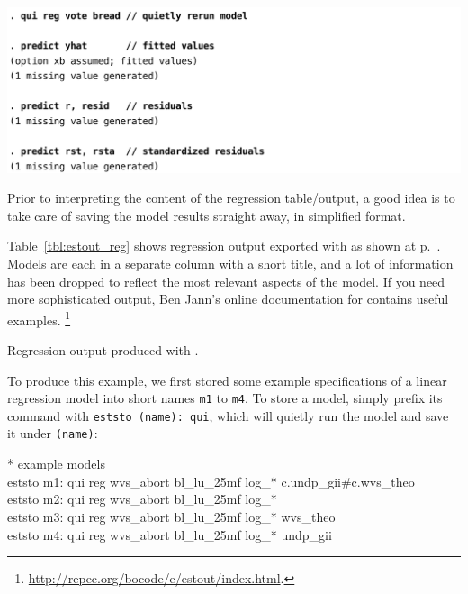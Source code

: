 \begin{table}[htp]
	\includegraphics[scale=.5]{images/hibbs_yx1_predict.pdf}

	\caption[Storing estimates with ]{\label{tbl:hibbs_yx1_predict}%
	Storing estimates with . %
	\hibbs}
\end{table}%

Prior to interpreting the content of the regression table/output, a good idea is to take care of saving the model results straight away, in simplified format.

Table~\ref{tbl:estout_reg} shows regression output exported with  as shown at p.~\pageref{tbl:hibbs_yx1_estout}. Models are each in a separate column with a short title, and a lot of information has been dropped to reflect the most relevant aspects of the model. If you need more sophisticated output, Ben Jann's online documentation for  contains useful examples.%
\footnote{\url{http://repec.org/bocode/e/estout/index.html}.}


\begin{fullwidth}
	\begin{table}
		\footnotesize
    
		\caption{Regression output produced with .}
		\label{tbl:estout_reg}
	\end{table}
\end{fullwidth}

To produce this example, we first stored some example specifications of a linear regression model into short names \texttt{m1} to \texttt{m4}. To store a model, simply prefix its command with \texttt{eststo (name): qui}, which will quietly run the model and save it under \texttt{(name)}:

\begin{docspec}
  * example models\\%
  eststo m1: qui reg wvs\_abort bl\_lu\_25mf log\_* c.undp\_gii\#c.wvs\_theo\\%
  eststo m2: qui reg wvs\_abort bl\_lu\_25mf log\_*\\%
  eststo m3: qui reg wvs\_abort bl\_lu\_25mf log\_* wvs\_theo\\%
  eststo m4: qui reg wvs\_abort bl\_lu\_25mf log\_* undp\_gii
\end{docspec}

